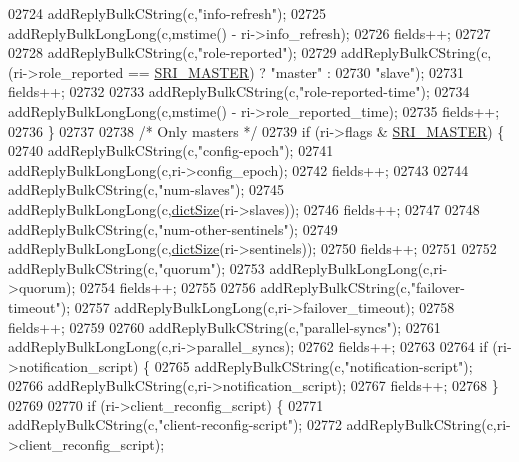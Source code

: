 \begin{DoxyCode}
{{{{{{{{{{{{{{{{{{{{{{{{{{{{{{{{{{{{{{{{{{{{{{{{{{{{{{{{{02724         addReplyBulkCString(c,\textcolor{stringliteral}{"info-refresh"});
02725         addReplyBulkLongLong(c,mstime() - ri->info\_refresh);
02726         fields++;
02727 
02728         addReplyBulkCString(c,\textcolor{stringliteral}{"role-reported"});
02729         addReplyBulkCString(c, (ri->role\_reported == \hyperlink{sentinel_8c_a2ee83e5ff67b45746cd6a310f15334b2}{SRI\_MASTER}) ? \textcolor{stringliteral}{"master"} :
02730                                                                    \textcolor{stringliteral}{"slave"});
02731         fields++;
02732 
02733         addReplyBulkCString(c,\textcolor{stringliteral}{"role-reported-time"});
02734         addReplyBulkLongLong(c,mstime() - ri->role\_reported\_time);
02735         fields++;
02736     \}
02737 
02738     \textcolor{comment}{/* Only masters */}
02739     \textcolor{keywordflow}{if} (ri->flags & \hyperlink{sentinel_8c_a2ee83e5ff67b45746cd6a310f15334b2}{SRI\_MASTER}) \{
02740         addReplyBulkCString(c,\textcolor{stringliteral}{"config-epoch"});
02741         addReplyBulkLongLong(c,ri->config\_epoch);
02742         fields++;
02743 
02744         addReplyBulkCString(c,\textcolor{stringliteral}{"num-slaves"});
02745         addReplyBulkLongLong(c,\hyperlink{dict_8h_af193430dd3d5579a52b194512f72c1f0}{dictSize}(ri->slaves));
02746         fields++;
02747 
02748         addReplyBulkCString(c,\textcolor{stringliteral}{"num-other-sentinels"});
02749         addReplyBulkLongLong(c,\hyperlink{dict_8h_af193430dd3d5579a52b194512f72c1f0}{dictSize}(ri->sentinels));
02750         fields++;
02751 
02752         addReplyBulkCString(c,\textcolor{stringliteral}{"quorum"});
02753         addReplyBulkLongLong(c,ri->quorum);
02754         fields++;
02755 
02756         addReplyBulkCString(c,\textcolor{stringliteral}{"failover-timeout"});
02757         addReplyBulkLongLong(c,ri->failover\_timeout);
02758         fields++;
02759 
02760         addReplyBulkCString(c,\textcolor{stringliteral}{"parallel-syncs"});
02761         addReplyBulkLongLong(c,ri->parallel\_syncs);
02762         fields++;
02763 
02764         \textcolor{keywordflow}{if} (ri->notification\_script) \{
02765             addReplyBulkCString(c,\textcolor{stringliteral}{"notification-script"});
02766             addReplyBulkCString(c,ri->notification\_script);
02767             fields++;
02768         \}
02769 
02770         \textcolor{keywordflow}{if} (ri->client\_reconfig\_script) \{
02771             addReplyBulkCString(c,\textcolor{stringliteral}{"client-reconfig-script"});
02772             addReplyBulkCString(c,ri->client\_reconfig\_script);
}}}}}}}}}}}}}}}}}}}}}}}}}}}}}}}}}}}}}}}}}}}}}}}}}}}}}}}}}
\end{DoxyCode}

